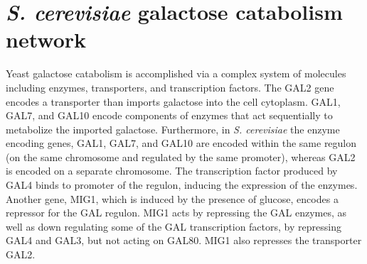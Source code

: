 \documentclass[11 pt]{article}
\begin{document}
  \section{\emph{S. cerevisiae} galactose catabolism network}

  Yeast galactose catabolism is accomplished via a complex system of molecules including enzymes, transporters, and transcription factors. The GAL2 gene encodes a transporter than imports galactose into the cell cytoplasm. GAL1, GAL7, and GAL10 encode components of enzymes that act sequentially to metabolize the imported galactose. Furthermore, in \emph{S. cerevisiae} the enzyme encoding genes, GAL1, GAL7, and GAL10 are encoded within the same regulon (on the same chromosome and regulated by the same promoter), whereas GAL2 is encoded on a separate chromosome. The transcription factor produced by GAL4 binds to promoter of the regulon, inducing the expression of the enzymes. Another gene, MIG1, which is induced by the presence of glucose, encodes a repressor for the GAL regulon. MIG1 acts by repressing the GAL enzymes, as well as down regulating some of the GAL transcription factors, by repressing GAL4 and GAL3, but not acting on GAL80. MIG1 also represses the transporter GAL2.
\end{document}
